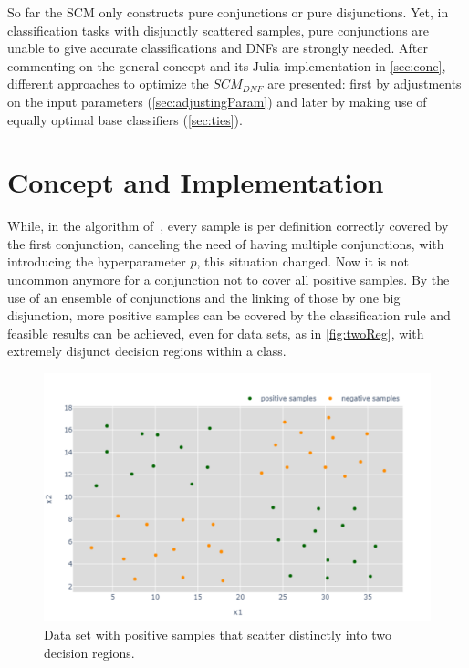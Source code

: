 So far the SCM only constructs pure conjunctions or pure disjunctions.
Yet, in classification tasks with disjunctly scattered samples, pure conjunctions are
unable to give accurate classifications and DNFs are strongly needed.
After commenting on the general concept and its Julia implementation in \autoref{sec:conc},
different approaches to optimize the \(SCM_{DNF}\) are presented:
first by adjustments on the input parameters (\autoref{sec:adjustingParam}) and later by
making use of equally optimal base classifiers (\autoref{sec:ties}).

\section{Concept and Implementation}\label{sec:conc}

While, in the algorithm of~\cite{haussler88}, every sample is per definition correctly covered by the first conjunction,
canceling the need of having multiple conjunctions, with~\cite{marchand02} introducing the hyperparameter \(p\), this situation changed.
Now it is not uncommon anymore for a conjunction not to cover all positive samples.
By the use of an ensemble of conjunctions and the linking of those by one big disjunction,
more positive samples can be covered by the classification rule and feasible results can be achieved, even for data sets, as in \autoref{fig:twoReg}, with
extremely disjunct decision regions within a class.

\begin{figure}[ht]
    \centering
    \includegraphics[width=0.85\columnwidth]{figures/two_reg.pdf}
    \caption{Data set with positive samples that scatter distinctly into two decision regions.}\label{fig:twoReg}
\end{figure}

